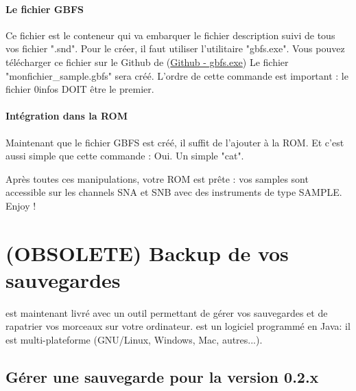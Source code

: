 \documentclass[12pt,a4paper]{article}
\begin{document}
  \paragraph{Le fichier GBFS} Ce fichier est le conteneur qui va embarquer le fichier description suivi de tous vos fichier ".snd". Pour le créer, il faut utiliser l'utilitaire "gbfs.exe". Vous pouvez télécharger ce fichier sur le Github de \FAT (\href{https://github.com/cbrouillard/furiousadvancetracker/blob/master/gbfs.exe?raw=true}{Github - gbfs.exe})
  Le fichier "monfichier\_sample.gbfs" sera créé. L'ordre de cette commande est important : le fichier 0infos DOIT être le premier.

  \paragraph{Intégration dans la ROM} Maintenant que le fichier GBFS est créé, il suffit de l'ajouter à la ROM. Et c'est aussi simple que cette commande :
  Oui. Un simple "cat".\medskip

  Après toutes ces manipulations, votre ROM est prête : vos samples sont accessible sur les channels SNA et SNB avec des instruments de type SAMPLE. Enjoy !

  \section{(OBSOLETE) Backup de vos sauvegardes}\label{burger}

  
  \FAT est maintenant livré avec un outil permettant de gérer vos sauvegardes et de rapatrier vos morceaux sur votre ordinateur. \BURGER est un logiciel programmé en Java: il est multi-plateforme (GNU/Linux, Windows, Mac, autres...).
  
    \subsection{Gérer une sauvegarde pour la version 0.2.x}
    
\end{document}
